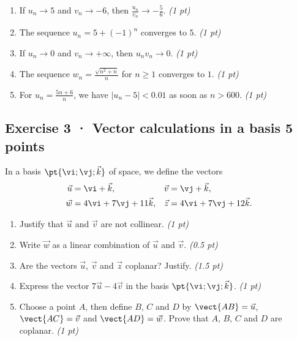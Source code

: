 \begin{enumerate}

\item If $u_n\to 5$ and $v_n\to-6$, then $\frac{u_n}{v_n}\to-\frac{5}{6}$. \hfill\textit{(1 pt)}

\item The sequence $u_n=5+(-1)^n$ converges to $5$. \hfill\textit{(1 pt)}

\item If $u_n\to0$ and $v_n\to+\infty$, then $u_nv_n\to0$. \hfill\textit{(1 pt)}

\item The sequence $w_n=\frac{\sqrt{n^2+n}}{n}$ for $n\ge1$ converges to $1$. \hfill\textit{(1 pt)}

\item For $u_n=\frac{5n+6}{n}$, we have $|u_n-5|<\num{0,01}$ as soon as $n> 600$. \hfill\textit{(1 pt)}

\end{enumerate}

\mxnewpage{}

\subsection*{Exercise 3 · Vector calculations in a basis \hfill 5 points}In a basis $\pt{\vi;\vj;\vec k}$ of space, we define the vectors
\[\begin{aligned}\vec u&=\vi+\vec k,&\vec v&=\vj+\vec k,\\
\vec w&=4\vi+7\vj+11\vec k,&\vec z&=4\vi+7\vj+12\vec k.\end{aligned}\]

\begin{enumerate}

\item Justify that $\vec u$ and $\vec v$ are not collinear. \hfill\textit{(1 pt)}

\item Write $\vec w$ as a linear combination of $\vec u$ and $\vec v$. \hfill\textit{(0.5 pt)}

\item Are the vectors $\vec u$, $\vec v$ and $\vec z$ coplanar? Justify. \hfill\textit{(1.5 pt)}

\item Express the vector $7\vec u-4\vec v$ in the basis $\pt{\vi;\vj;\vec k}$. \hfill\textit{(1 pt)}

\item Choose a point $A$, then define $B$, $C$ and $D$ by $\vect{AB}=\vec u$, $\vect{AC}=\vec v$ and $\vect{AD}=\vec w$. Prove that $A$, $B$, $C$ and $D$ are coplanar. \hfill\textit{(1 pt)}

\end{enumerate}

